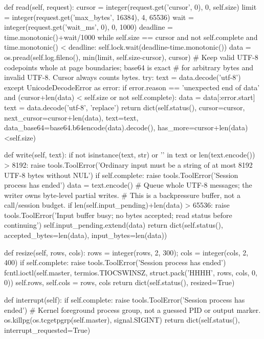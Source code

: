     def read(self, request):
        cursor = integer(request.get('cursor', 0), 0, self.size)
        limit = integer(request.get('max_bytes', 16384), 4, 65536)
        wait = integer(request.get('wait_ms', 0), 0, 1000)
        deadline = time.monotonic()+wait/1000
        while self.size == cursor and not self.complete and time.monotonic() < deadline:
            self.lock.wait(deadline-time.monotonic())
        data = os.pread(self.log.fileno(), min(limit, self.size-cursor), cursor)
        # Keep valid UTF-8 codepoints whole at page boundaries; base64 is exact
        # for arbitrary bytes and invalid UTF-8. Cursor always counts bytes.
        try: text = data.decode('utf-8')
        except UnicodeDecodeError as error:
            if error.reason == 'unexpected end of data' and (cursor+len(data) < self.size or not self.complete):
                data = data[:error.start]
            text = data.decode('utf-8', 'replace')
        return dict(self.status(), cursor=cursor, next_cursor=cursor+len(data), text=text,
                    data_base64=base64.b64encode(data).decode(), has_more=cursor+len(data)<self.size)

    def write(self, text):
        if not isinstance(text, str) or '\0' in text or len(text.encode()) > 8192:
            raise tools.ToolError('Ordinary input must be a string of at most 8192 UTF-8 bytes without NUL')
        if self.complete: raise tools.ToolError('Session process has ended')
        data = text.encode()
        # Queue whole UTF-8 messages; the writer owns byte-level partial writes.
        # This is a backpressure buffer, not a call/session budget.
        if len(self.input_pending)+len(data) > 65536:
            raise tools.ToolError('Input buffer busy; no bytes accepted; read status before continuing')
        self.input_pending.extend(data)
        return dict(self.status(), accepted_bytes=len(data), input_bytes=len(data))

    def resize(self, rows, cols):
        rows = integer(rows, 2, 300); cols = integer(cols, 2, 400)
        if self.complete: raise tools.ToolError('Session process has ended')
        fcntl.ioctl(self.master, termios.TIOCSWINSZ, struct.pack('HHHH', rows, cols, 0, 0))
        self.rows, self.cols = rows, cols
        return dict(self.status(), resized=True)

    def interrupt(self):
        if self.complete: raise tools.ToolError('Session process has ended')
        # Kernel foreground process group, not a guessed PID or output marker.
        os.killpg(os.tcgetpgrp(self.master), signal.SIGINT)
        return dict(self.status(), interrupt_requested=True)

